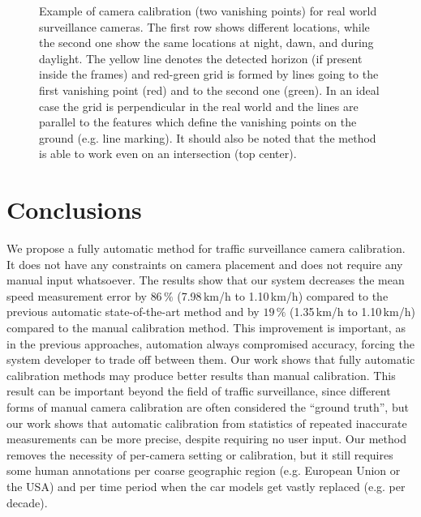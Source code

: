 \documentclass[]{elsarticle}
\begin{document}
\begin{figure*}[t]
	\centering
	\caption{Example of camera calibration (two vanishing points) for real world surveillance cameras. The first row shows different locations, while the second one show the same locations at night, dawn, and during daylight. The yellow line denotes the detected horizon (if present inside the frames) and red-green grid is formed by lines going to the first vanishing point (red) and to the second one (green). In an ideal case the grid is perpendicular in the real world and the lines are parallel to the features which define the vanishing points on the ground (e.g. line marking). It should also be noted that the method is able to work even on an intersection (top center). }
	\label{fig:RealWorldCalib}
\end{figure*}

\section{Conclusions}

We propose a fully automatic method for traffic surveillance camera calibration. It does not have any constraints on camera placement and does not require any manual input whatsoever. The results show that our system decreases the mean speed measurement error by $86\,\%$ (7.98\,km/h to 1.10\,km/h) compared to the previous automatic state-of-the-art method and by $19\,\%$ (1.35\,km/h to 1.10\,km/h) compared to the manual calibration method. This improvement is important, as in the previous approaches, automation always compromised accuracy, forcing the system developer to trade off between them.  Our work shows that fully automatic calibration methods may produce better results than manual calibration. This result can be important beyond the field of traffic surveillance, since different forms of manual camera calibration are often considered the ``ground truth'', but our work shows that automatic calibration from statistics of repeated inaccurate measurements can be more precise, despite requiring no user input.
Our method removes the necessity of per-camera setting or calibration, but it still requires some human annotations per coarse geographic region (e.g. European Union or the USA) and per time period when the car models get vastly replaced (e.g. per decade). 
\end{document}
